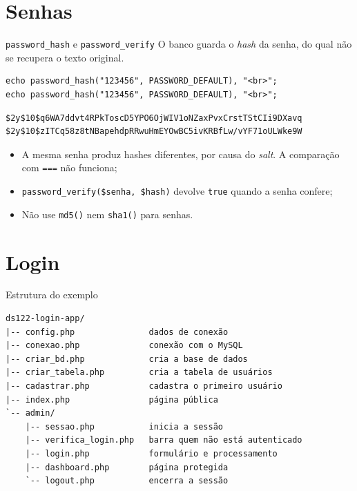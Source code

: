 \documentclass{beamer}
\begin{document}
\section{Senhas}

\begin{frame}[fragile]{\texttt{password\_hash} e \texttt{password\_verify}}
	O banco guarda o \emph{hash} da senha, do qual não se recupera o texto
	original.

	\begin{verbatim}
echo password_hash("123456", PASSWORD_DEFAULT), "<br>";
echo password_hash("123456", PASSWORD_DEFAULT), "<br>";
	\end{verbatim}

	\begin{verbatim}
$2y$10$q6WA7ddvt4RPkToscD5YPO6OjWIV1oNZaxPvxCrstTStCIi9DXavq
$2y$10$zITCq58z8tNBapehdpRRwuHmEYOwBC5ivKRBfLw/vYF71oULWke9W
	\end{verbatim}

	\begin{itemize}
		\item A mesma senha produz hashes diferentes, por causa do \emph{salt}. A
		      comparação com \texttt{===} não funciona;
		\item \texttt{password\_verify(\$senha, \$hash)} devolve \texttt{true}
		      quando a senha confere;
		\item Não use \texttt{md5()} nem \texttt{sha1()} para senhas.
	\end{itemize}
\end{frame}

\section{Login}

\begin{frame}[fragile]{Estrutura do exemplo}
	\begin{verbatim}
ds122-login-app/
|-- config.php               dados de conexão
|-- conexao.php              conexão com o MySQL
|-- criar_bd.php             cria a base de dados
|-- criar_tabela.php         cria a tabela de usuários
|-- cadastrar.php            cadastra o primeiro usuário
|-- index.php                página pública
`-- admin/
    |-- sessao.php           inicia a sessão
    |-- verifica_login.php   barra quem não está autenticado
    |-- login.php            formulário e processamento
    |-- dashboard.php        página protegida
    `-- logout.php           encerra a sessão
	\end{verbatim}
\end{frame}
\end{document}
